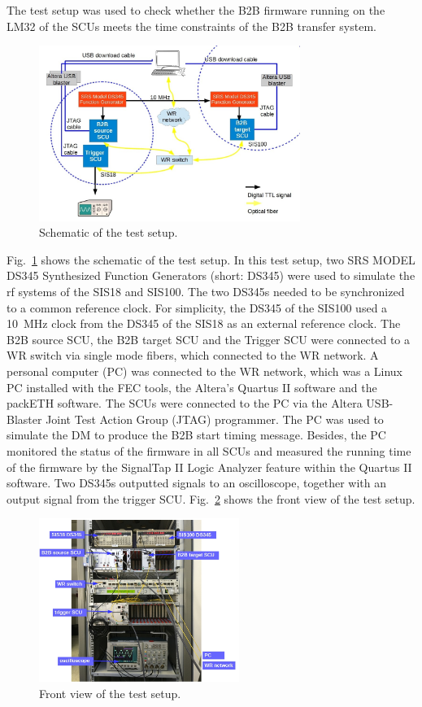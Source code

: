 The test setup was used to check whether the B2B firmware running on the LM32 of the SCUs meets the time constraints of the B2B transfer system.  

\begin{figure}[!htb]
   \centering   
   \includegraphics*[width=85mm]{schematic_setup.jpg}
   \caption{Schematic of the test setup.}
   \label{setup}
\end{figure}
Fig.~\ref{setup} shows the schematic of the test setup. In this test setup, two SRS MODEL DS345 Synthesized Function Generators (short: DS345) were used to simulate the rf systems of the SIS18 and SIS100. The two DS345s needed to be synchronized to a common reference clock. For simplicity, the DS345 of the SIS100 used a \SI{10}{\MHz} clock from the DS345 of the SIS18 as an external reference clock. The B2B source SCU, the B2B target SCU and the Trigger SCU were connected to a WR switch via single mode fibers, which connected to the WR network. A personal computer (PC) was connected to the WR network, which was a Linux PC installed with the FEC tools, the Altera's Quartus II software and the packETH software. The SCUs were connected to the PC via the Altera USB-Blaster Joint Test Action Group (JTAG) programmer. The PC was used to simulate the DM to produce the B2B start timing message. Besides, the PC monitored the status of the firmware in all SCUs and measured the running time of the firmware by the SignalTap II Logic Analyzer feature within the Quartus II software. Two DS345s outputted signals to an oscilloscope, together with an output signal from the trigger SCU. Fig.~\ref{testsetup_text} shows the front view of the test setup. 
\begin{figure}[!htb]
   \centering   
   \includegraphics*[width=65mm]{testsetup_text.jpg}
   \caption{Front view of the test setup.}
   \label{testsetup_text}
\end{figure}

